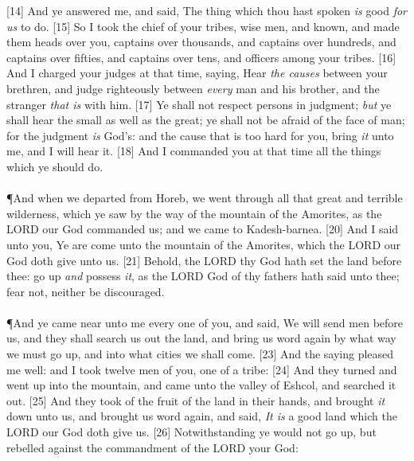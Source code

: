 [14] \textcolor[rgb]{0.00,0.00,1.00}{And ye answered me, and said, The thing which thou hast spoken \emph{is} good \emph{for us} to do.}
[15] \textcolor[rgb]{0.00,0.00,1.00}{So I took the chief of your tribes, wise men, and known, and made them heads over you, captains over thousands, and captains over hundreds, and captains over fifties, and captains over tens, and officers among your tribes.}
[16] \textcolor[rgb]{0.00,0.00,1.00}{And I charged your judges at that time, saying, Hear \emph{the causes} between your brethren, and judge righteously between \emph{every} man and his brother, and the stranger \emph{that is} with him.}
[17] \textcolor[rgb]{0.00,0.00,1.00}{Ye shall not respect persons in judgment; \emph{but} ye shall hear the small as well as the great; ye shall not be afraid of the face of man; for the judgment \emph{is} God's: and the cause that is too hard for you, bring \emph{it} unto me, and I will hear it.}
[18] \textcolor[rgb]{0.00,0.00,1.00}{And I commanded you at that time all the things which ye should do.}\\
\\
\P \textcolor[rgb]{0.00,0.00,1.00}{And when we departed from Horeb, we went through all that great and terrible wilderness, which ye saw by the way of the mountain of the Amorites, as the LORD our God commanded us; and we came to Kadesh-barnea.}
[20] \textcolor[rgb]{0.00,0.00,1.00}{And I said unto you, Ye are come unto the mountain of the Amorites, which the LORD our God doth give unto us.}
[21] \textcolor[rgb]{0.00,0.00,1.00}{Behold, the LORD thy God hath set the land before thee: go up \emph{and} possess \emph{it}, as the LORD God of thy fathers hath said unto thee; fear not, neither be discouraged.}\\
\\
\P \textcolor[rgb]{0.00,0.00,1.00}{And ye came near unto me every one of you, and said, We will send men before us, and they shall search us out the land, and bring us word again by what way we must go up, and into what cities we shall come.}
[23] \textcolor[rgb]{0.00,0.00,1.00}{And the saying pleased me well: and I took twelve men of you, one of a tribe:}
[24] \textcolor[rgb]{0.00,0.00,1.00}{And they turned and went up into the mountain, and came unto the valley of Eshcol, and searched it out.}
[25] \textcolor[rgb]{0.00,0.00,1.00}{And they took of the fruit of the land in their hands, and brought \emph{it} down unto us, and brought us word again, and said, \emph{It is} a good land which the LORD our God doth give us.}
[26] \textcolor[rgb]{0.00,0.00,1.00}{Notwithstanding ye would not go up, but rebelled against the commandment of the LORD your God:}
